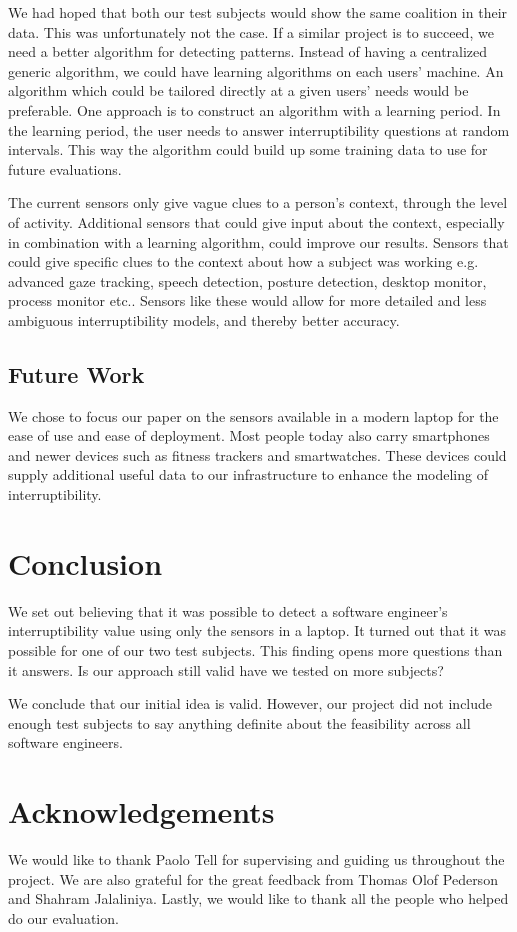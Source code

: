 \documentclass{sigchi}
\begin{document}
We had hoped that both our test subjects would show the same coalition in their data.
This was unfortunately not the case.
If a similar project is to succeed, we need a better algorithm for detecting patterns.
Instead of having a centralized generic algorithm, we could have learning algorithms on each users' machine.
An algorithm which could be tailored directly at a given users' needs would be preferable.
One approach is to construct an algorithm with a learning period.
In the learning period, the user needs to answer interruptibility questions at random intervals.
This way the algorithm could build up some training data to use for future evaluations.

The current sensors only give vague clues to a person's context, through the level of activity.
Additional sensors that could give input about the context, especially in combination with a learning algorithm, could improve our results.
Sensors that could give specific clues to the context about how a subject was working e.g. advanced gaze tracking, speech detection, posture detection, desktop monitor, process monitor etc..
Sensors like these would allow for more detailed and less ambiguous interruptibility models, and thereby better accuracy.

\subsection{Future Work}
We chose to focus our paper on the sensors available in a modern laptop for the ease of use and ease of deployment.
Most people today also carry smartphones and newer devices such as fitness trackers and smartwatches.
These devices could supply additional useful data to our infrastructure to enhance the modeling of interruptibility.

\section{Conclusion}
We set out believing that it was possible to detect a software engineer's interruptibility value using only the sensors in a laptop.
It turned out that it was possible for one of our two test subjects.
This finding opens more questions than it answers. Is our approach still valid have we tested on more subjects?

We conclude that our initial idea is valid.
However, our project did not include enough test subjects to say anything definite about the feasibility across all software engineers.

\section{Acknowledgements}
We would like to thank Paolo Tell for supervising and guiding us throughout the project.
We are also grateful for the great feedback from Thomas Olof Pederson and Shahram Jalaliniya.
Lastly, we would like to thank all the people who helped do our evaluation.

\balance


\end{document}
